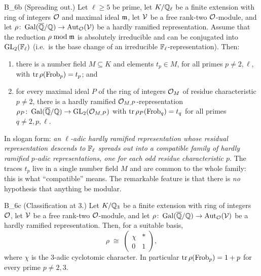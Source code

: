 \documentclass[11pt]{article}
\begin{document}
\begin{Bn}{B_{6b}}
\textup{(Spreading out.)} Let $\ell\geq5$ be prime, let $K/\mathbb{Q}_\ell$ be a finite
extension with ring of integers $\mathcal{O}$ and maximal ideal $\mathfrak{m}$, let $\mathcal{V}$ be
a free rank-two $\mathcal{O}$-module, and let $\rho\colon\operatorname{Gal}(\overline{\mathbb{Q}}/\mathbb{Q})\to\operatorname{Aut}_{\mathcal{O}}(\mathcal{V})$ be a
hardly ramified representation. Assume that the reduction $\rho\bmod\mathfrak{m}$ is
absolutely irreducible and can be conjugated into $\operatorname{GL}_2(\mathbb{F}_\ell)$ \textup{(}i.e.\ is
the base change of an irreducible $\mathbb{F}_\ell$-representation\textup{)}. Then:
\begin{enumerate}
\item[\textup{(i)}] there is a number field $M\subseteq K$ and elements
$t_p\in M$, for all primes $p\neq2,\ell$, with $\operatorname{tr}\rho(\operatorname{Frob}_p)=t_p$; and
\item[\textup{(ii)}] for every maximal ideal $P$ of the ring of integers
$\mathcal{O}_M$ of residue characteristic $p\neq2$, there is a hardly ramified
$\mathcal{O}_{M,P}$-representation $\rho_P\colon\operatorname{Gal}(\overline{\mathbb{Q}}/\mathbb{Q})\to\operatorname{GL}_2(\mathcal{O}_{M,P})$ with
$\operatorname{tr}\rho_P(\operatorname{Frob}_q)=t_q$ for all primes $q\neq 2,p,\ell$.
\end{enumerate}
\end{Bn}

\noindent
In slogan form: \emph{an $\ell$-adic hardly ramified representation whose
residual representation descends to $\mathbb{F}_\ell$ spreads out into a compatible
family of hardly ramified $p$-adic representations, one for each odd residue
characteristic $p$}. The traces $t_p$ live in a single number field $M$ and are
common to the whole family: this is what ``compatible'' means. The remarkable
feature is that there is \emph{no} hypothesis that anything be modular.

\begin{Bn}{B_{6c}}
\textup{(Classification at $3$.)} Let $K/\mathbb{Q}_3$ be a finite extension with ring
of integers $\mathcal{O}$, let $\mathcal{V}$ be a free rank-two $\mathcal{O}$-module, and let
$\rho\colon\operatorname{Gal}(\overline{\mathbb{Q}}/\mathbb{Q})\to\operatorname{Aut}_{\mathcal{O}}(\mathcal{V})$ be a hardly ramified representation. Then,
for a suitable basis,
\[
  \rho\;\cong\;\begin{pmatrix}\chi & * \\ 0 & 1\end{pmatrix},
\]
where $\chi$ is the $3$-adic cyclotomic character. In particular
$\operatorname{tr}\rho(\operatorname{Frob}_p)=1+p$ for every prime $p\neq2,3$.
\end{Bn}
\end{document}
